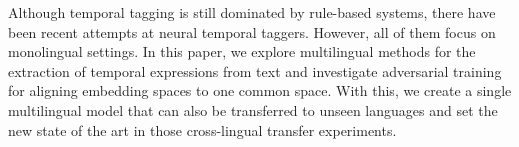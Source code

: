 Although temporal tagging is still dominated by rule-based systems, there have been recent attempts at neural temporal taggers. However, all of them focus on monolingual settings. In this paper, we explore multilingual methods for the extraction of temporal expressions from text and investigate adversarial training for aligning embedding spaces to one common space. With this, we create a single multilingual model that can also be transferred to unseen languages and set the new state of the art in those cross-lingual transfer experiments.
